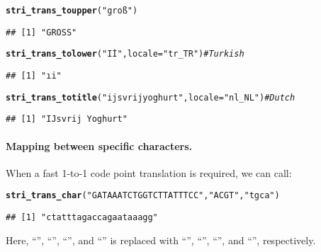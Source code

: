 \documentclass[nojss]{jss}\usepackage[]{graphicx}\usepackage[]{xcolor}
\makeatletter
\newcommand{\hlstr}[1]{\textcolor[rgb]{0.192,0.494,0.8}{#1}}%
\newcommand{\hlcom}[1]{\textcolor[rgb]{0.678,0.584,0.686}{\textit{#1}}}%
\newcommand{\hlstd}[1]{\textcolor[rgb]{0.345,0.345,0.345}{#1}}%
\newcommand{\hlkwc}[1]{\textcolor[rgb]{0.333,0.667,0.333}{#1}}%
\newcommand{\hlkwd}[1]{\textcolor[rgb]{0.737,0.353,0.396}{\textbf{#1}}}%
\newenvironment{kframe}{%
 \def\at@end@of@kframe{}%
 \ifinner\ifhmode%
  \def\at@end@of@kframe{\end{minipage}}%
  \begin{minipage}{\columnwidth}%
 \fi\fi%
 \def\FrameCommand##1{\hskip\@totalleftmargin \hskip-\fboxsep
 \colorbox{shadecolor}{##1}\hskip-\fboxsep
     \hskip-\linewidth \hskip-\@totalleftmargin \hskip\columnwidth}%
 \MakeFramed {\advance\hsize-\width
   \@totalleftmargin\z@ \linewidth\hsize
   \@setminipage}}%
 {\par\unskip\endMakeFramed%
 \at@end@of@kframe}
\newenvironment{knitrout}{}{} %
\makeatother
\begin{document}
\begin{knitrout}
\color{fgcolor}\begin{kframe}
\begin{alltt}
\hlkwd{stri_trans_toupper}\hlstd{(}\hlstr{"groß"}\hlstd{)}
\end{alltt}
\begin{verbatim}
## [1] "GROSS"
\end{verbatim}
\begin{alltt}
\hlkwd{stri_trans_tolower}\hlstd{(}\hlstr{"Iİ"}\hlstd{,} \hlkwc{locale}\hlstd{=}\hlstr{"tr_TR"}\hlstd{)}               \hlcom{# Turkish}
\end{alltt}
\begin{verbatim}
## [1] "ıi"
\end{verbatim}
\begin{alltt}
\hlkwd{stri_trans_totitle}\hlstd{(}\hlstr{"ijsvrij yoghurt"}\hlstd{,} \hlkwc{locale}\hlstd{=}\hlstr{"nl_NL"}\hlstd{)}  \hlcom{# Dutch}
\end{alltt}
\begin{verbatim}
## [1] "IJsvrij Yoghurt"
\end{verbatim}
\end{kframe}
\end{knitrout}







\paragraph{Mapping between specific characters.}
When a fast 1-to-1 code point translation is required, we can call:

\begin{knitrout}
\color{fgcolor}\begin{kframe}
\begin{alltt}
\hlkwd{stri_trans_char}\hlstd{(}\hlstr{"GATAAATCTGGTCTTATTTCC"}\hlstd{,} \hlstr{"ACGT"}\hlstd{,} \hlstr{"tgca"}\hlstd{)}
\end{alltt}
\begin{verbatim}
## [1] "ctatttagaccagaataaagg"
\end{verbatim}
\end{kframe}
\end{knitrout}

Here, ``'', ``'', ``'', and ``''
is replaced with
``'', ``'', ``'', and ``'', respectively.
\end{document}
